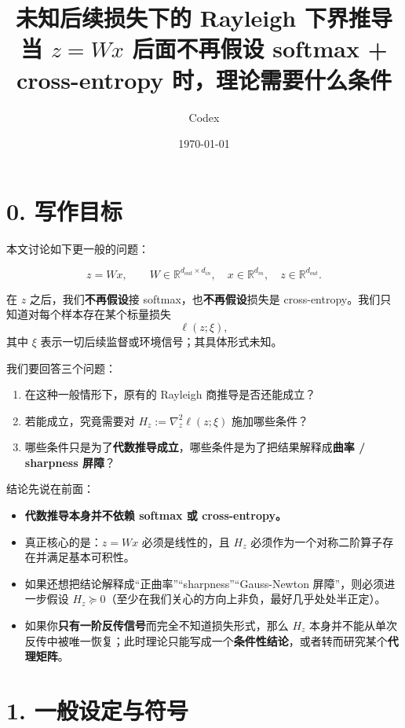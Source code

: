 \documentclass[11pt]{ctexart}
\title{未知后续损失下的 Rayleigh 下界推导\\
\large 当 $z = Wx$ 后面不再假设 softmax + cross-entropy 时，理论需要什么条件}
\author{Codex}
\date{\today}
\begin{document}
\maketitle

\section*{0. 写作目标}

本文讨论如下更一般的问题：

\[
z = Wx, \qquad W \in \mathbb{R}^{d_{out} \times d_{in}}, \quad x \in \mathbb{R}^{d_{in}}, \quad z \in \mathbb{R}^{d_{out}}.
\]

在 $z$ 之后，我们\textbf{不再假设}接 softmax，也\textbf{不再假设}损失是 cross-entropy。我们只知道对每个样本存在某个标量损失
\[
\ell(z; \xi),
\]
其中 $\xi$ 表示一切后续监督或环境信号；其具体形式未知。

我们要回答三个问题：

\begin{enumerate}[label=\arabic*.]
    \item 在这种一般情形下，原有的 Rayleigh 商推导是否还能成立？
    \item 若能成立，究竟需要对 $H_z := \nabla_z^2 \ell(z;\xi)$ 施加哪些条件？
    \item 哪些条件只是为了\textbf{代数推导成立}，哪些条件是为了把结果解释成\textbf{曲率 / sharpness 屏障}？
\end{enumerate}

结论先说在前面：

\begin{itemize}
    \item \textbf{代数推导本身并不依赖 softmax 或 cross-entropy。}
    \item 真正核心的是：$z=Wx$ 必须是线性的，且 $H_z$ 必须作为一个对称二阶算子存在并满足基本可积性。
    \item 如果还想把结论解释成“正曲率”“sharpness”“Gauss-Newton 屏障”，则必须进一步假设 $H_z \succeq 0$（至少在我们关心的方向上非负，最好几乎处处半正定）。
    \item 如果你\textbf{只有一阶反传信号}而完全不知道损失形式，那么 $H_z$ 本身并不能从单次反传中被唯一恢复；此时理论只能写成一个\textbf{条件性结论}，或者转而研究某个\textbf{代理矩阵}。
\end{itemize}

\section*{1. 一般设定与符号}
\end{document}
